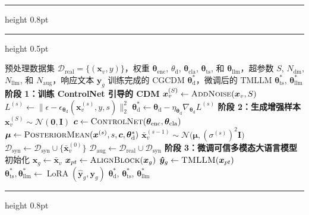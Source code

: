 \vspace{1em}
\hrule height 0.8pt
\vspace{3pt}
\begingroup
\captionsetup{singlelinecheck=false, justification=raggedright, font=normalsize}
\label{alg:training}
\endgroup
\vspace{3pt}
\hrule height 0.5pt
\vspace{3pt}
\begingroup
\linespread{1.25}\selectfont
\begin{algorithmic}[1]
    \Require 预处理数据集 $\mathcal{D}_\text{real}=\{(\mathbf{x}_{v},y)\}$，权重 $\bm{\theta}_\mathrm{enc}$, ${\theta}_\mathrm{d}$, $\bm{\theta}_\mathrm{cla}$, $\bm{\theta}_\mathrm{ts}$, 和 $\bm{\theta}_\mathrm{llm}$，超参数 $S$, $N_\mathrm{dm}$, $N_\mathrm{llm}$, 和 $N_{\text{aug}}$，响应文本 $\bm{y}_{g}$
    \Ensure 训练完成的 CGCDM $\bm{\theta}_\mathrm{d}^*$，微调后的 TMLLM $\bm{\theta}_\mathrm{ts}^*$, $\bm{\theta}_\mathrm{llm}^*$
    \Statex \textbf{阶段 1：训练 ControlNet 引导的 CDM}
     
    \State $\bm{x}_{v}^{(S)}\leftarrow\textsc{AddNoise}(\bm{x}_{v},S)$
    \State $L^{(s)}\!\leftarrow\!\lVert\epsilon-\epsilon_{\bm{\theta}_\mathrm{d}}(\bm{x}_{v}^{(s)},y,s)\rVert_2^2$
    \State $\bm{\theta}_\mathrm{d}^*\!\leftarrow\!\bm{\theta}_\mathrm{d}-\eta_{\bm{\theta}_\mathrm{d}}\nabla_{\bm{\theta}_\mathrm{d}}L^{(s)}$
    \EndFor
    \EndFor
    \Statex \textbf{阶段 2：生成增强样本}
     
    \State $\bm x_{v}^{(S)}\sim\mathcal N(\bm 0,\bm I)$ 
    \State $\bm c\leftarrow\textsc{ControlNet}(\bm{\theta}_\mathrm{enc}, \bm{\theta}_\mathrm{cla})$
    \State $\bm\mu\leftarrow\textsc{PosteriorMean}(\bm x^{(s)},s,\bm c,\bm{\theta}_\mathrm{d}^*)$
    \State $\bm\bar{\bm x}_{v}^{(s-1)}\sim\mathcal N\!\bigl(\bm\mu,(\sigma^{(s)})^{2}\bm I\bigr)$
    \EndFor
    \State $\mathcal D_{\text{syn}}\gets\mathcal D_{\text{syn}}\cup\{\bar{\bm{x}}_v^{(0)}\}$
    \EndFor
    \State $\mathcal{D}_\text{aug}\!\leftarrow\!\mathcal{D}_\text{real}\cup\mathcal{D}_\text{syn}$
    \Statex \textbf{阶段 3：微调可信多模态大语言模型}
    \State 初始化 ${\bm{x}}_g\!\leftarrow\!\bar{\bm{x}}_v$
     
    \State $\bm{x}_{pt}\leftarrow\textsc{AlignBlock}(\bm{x}_{g})$
    \State $\bm{\hat y}_{g}\leftarrow\textsc{TMLLM}(\bm{x}_{pt})$
    \State $\bm{\theta}_\mathrm{ts}^*, \bm{\theta}_\mathrm{llm}^*\leftarrow \operatorname{LoRA}(\bm{\hat y}_{g}, \bm{y}_{g})$
    \EndFor
    \EndFor
    \State \Return $\bm{\theta}_\mathrm{d}^*$,  $\bm{\theta}_\mathrm{ts}^*$, $\bm{\theta}_\mathrm{llm}^*$
\end{algorithmic}
\endgroup
\vspace{3pt}
\hrule height 0.8pt
\vspace{1em}


